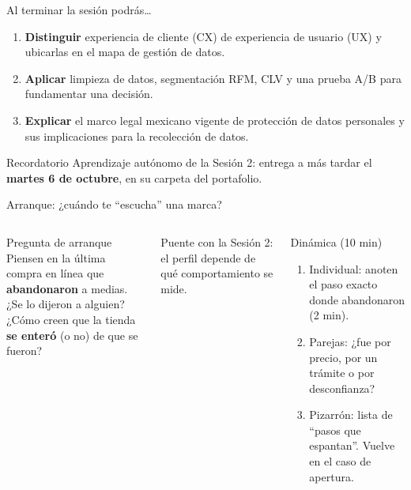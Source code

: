 \documentclass[aspectratio=169,xcolor=dvipsnames]{beamer}
\begin{document}
\begin{frame}{Al terminar la sesión podrás\ldots}
\begin{enumerate}
  \item \textbf{Distinguir} experiencia de cliente (CX) de experiencia de usuario (UX) y ubicarlas en el mapa de gestión de datos.
  \vspace{6pt}
  \item \textbf{Aplicar} limpieza de datos, segmentación RFM, CLV y una prueba A/B para fundamentar una decisión.
  \vspace{6pt}
  \item \textbf{Explicar} el marco legal mexicano vigente de protección de datos personales y sus implicaciones para la recolección de datos.
\end{enumerate}
\vspace{8pt}
\begin{alertblock}{Recordatorio}
  Aprendizaje autónomo de la Sesión 2: entrega a más tardar el \textbf{martes 6 de octubre}, en su carpeta del portafolio.
\end{alertblock}
\end{frame}

\begin{frame}{Arranque: ¿cuándo te \enquote{escucha} una marca?}
\begin{columns}[T]
  \begin{exampleblock}{Pregunta de arranque}
    Piensen en la última compra en línea que \textbf{abandonaron} a medias.\\[4pt]
    ¿Se lo dijeron a alguien? ¿Cómo creen que la tienda \textbf{se enteró} (o no) de que se fueron?
  \end{exampleblock}
  \vspace{4pt}
  {\small\color{IPNgris} Puente con la Sesión 2: el perfil depende de qué comportamiento se mide.}
  \begin{block}{Dinámica (10 min)}
    \small
    \begin{enumerate}
      \item Individual: anoten el paso exacto donde abandonaron (2 min).
      \item Parejas: ¿fue por precio, por un trámite o por desconfianza?
      \item Pizarrón: lista de \enquote{pasos que espantan}. Vuelve en el caso de apertura.
    \end{enumerate}
  \end{block}
\end{columns}
\end{frame}
\end{document}
